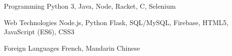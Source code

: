 

\begin{cvskills}

  \cvskill
  {Programming} %
  {Python 3, Java, Node, Racket, C, Selenium} %

  \cvskill
  {Web Technologies} %
  {Node.js, Python Flask, SQL/MySQL, Firebase, HTML5, JavaScript (ES6), CSS3} %

  \cvskill
  {Foreign Languages} %
  {French, Mandarin Chinese} %

\end{cvskills}

